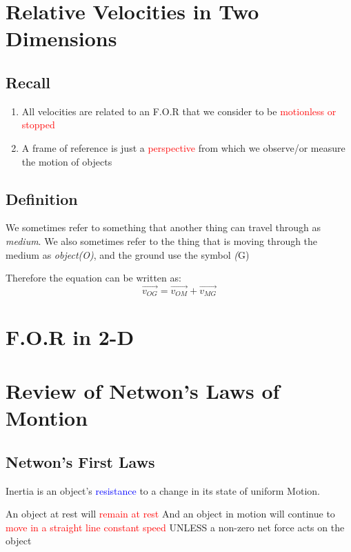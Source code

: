 \section{Relative Velocities in Two Dimensions}
\subsection{Recall}
\begin{enumerate}
    \item All velocities are related to an F.O.R that we consider to be \textcolor{red}{motionless or stopped}
    \item A frame of reference is just a \textcolor{red}{perspective} from which we observe/or measure the motion of objects
\end{enumerate}
\subsection{Definition}
We sometimes refer to something that another thing can travel through as \textit{medium}. We also sometimes refer to the thing that is moving through the medium as \textit{object(O)}, and the 
ground use the symbol \textit(G)

Therefore the equation can be written as:
\[
\vec{v_{OG}} = \vec{v_{OM}} + \vec{v_{MG}}
\]

\newpage
\section{F.O.R in 2-D}
\newpage

\section{Review of Netwon's Laws of Montion}
\subsection{Netwon's First Laws}
Inertia is an object's \textcolor{blue}{resistance} to a change in its state of uniform Motion.
\begin{example}
    An object at rest will \textcolor{red}{remain at rest} And an object in motion will continue
    to \textcolor{red}{move in a straight line constant speed} UNLESS a non-zero net force acts on 
    the object
\end{example}

